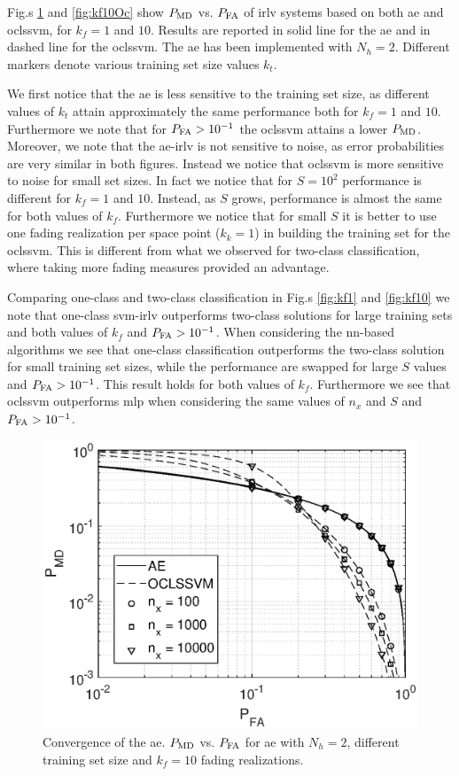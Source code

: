\documentclass[draftcls,onecolumn,12pt]{IEEEtran}
\begin{document}
Fig.s \ref{fig:kf1Oc} and \ref{fig:kf10Oc} show $P_{\rm MD}$ vs. $P_{\rm FA}$ of \ac{irlv} systems based on  both \ac{ae} and \ac{oclssvm}, for $k_f = 1$ and $10$.  Results are reported in solid line for the \ac{ae} and in dashed line for the \ac{oclssvm}. The \ac{ae} has been implemented with $N_h=2$. Different markers denote various training set size values $k_t$.

We first notice that the \ac{ae} is less sensitive to the training set size, as different values of $k_t$ attain approximately the same performance both for $k_f=1$ and $10$. Furthermore we note that for $P_{\rm FA} > 10^{-1}$ the \ac{oclssvm} attains a lower  $P_{\rm MD}$. Moreover, we note that the \ac{ae}-\ac{irlv} is not sensitive to noise, as error probabilities are very similar in both figures. Instead we notice that  \ac{oclssvm} is more sensitive to noise for small set sizes. In fact we notice that for $S=10^2$ performance is different for $k_f=1$ and $10$. Instead, as $S$ grows, performance is almost the same for both values of $k_f$. Furthermore we notice that for small $S$ it is better to use one fading realization per space point ($k_k=1$) in building the training set for the \ac{oclssvm}. This is different  from what we observed for two-class classification, where taking more fading measures provided an advantage.  

Comparing one-class and two-class classification in Fig.s \ref{fig:kf1} and \ref{fig:kf10} we note that  one-class \ac{svm}-\ac{irlv} outperforms  two-class solutions for large training sets and  both values of $k_f$ and $P_{\rm FA}>10^{-1}$. When considering the \ac{nn}-based algorithms we see that one-class classification outperforms the two-class solution for small training set sizes, while the performance are swapped for large $S$ values and $P_{\rm FA} > 10^{-1}$. This result holds for both values of $k_f$. Furthermore we see that \ac{oclssvm} outperforms \ac{mlp} when considering the same values of $n_x$ and $S$ and $P_{\rm FA}> 10^{-1}$.


\begin{figure}[t]
    \centering
    \includegraphics[width=0.6\columnwidth]{res_avgnTrain_oneClass_kf1.eps}
    \caption{Convergence of the \ac{ae}. $P_{\rm MD}$ vs. $P_{\rm FA}$ for \ac{ae} with $N_h = 2$, different training set size and $k_f=10$ fading realizations.}
    \label{fig:kf1Oc}
\end{figure}
\end{document}
